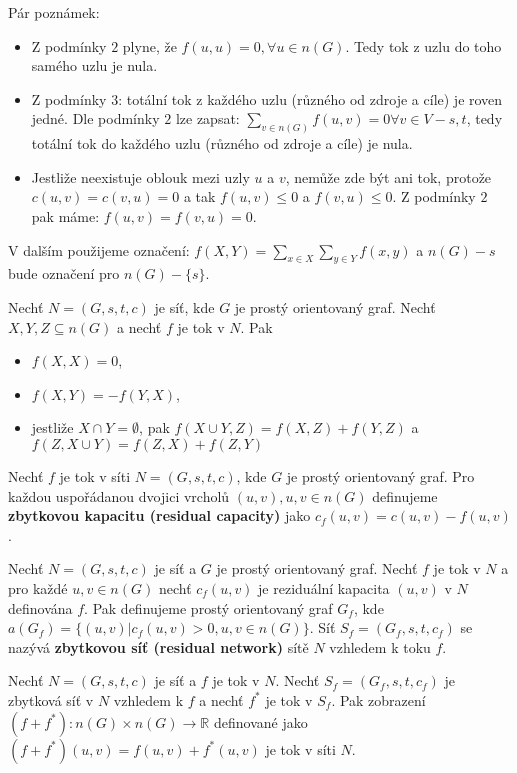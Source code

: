 Pár poznámek:
\begin{itemize}
    \item Z podmínky $2$ plyne, že $f(u,u) = 0, \forall u \in n(G)$. Tedy tok z uzlu do toho samého uzlu je nula.
    \item Z podmínky $3$: totální tok z každého uzlu (různého od zdroje a cíle) je roven jedné. Dle podmínky $2$ lze zapsat: $\sum_{v \in n(G)} f(u,v) = 0 \forall v \in V - {s,t}$, tedy totální tok do každého uzlu (různého od zdroje a cíle) je nula.
    \item Jestliže neexistuje oblouk mezi uzly $u$ a $v$, nemůže zde být ani tok, protože $c(u,v) = c(v,u) = 0$ a tak $f(u,v) \leq 0$ a $f(v,u) \leq 0$. Z podmínky $2$ pak máme: $f(u,v) = f(v,u) = 0$.
\end{itemize}

V dalším použijeme označení: $f(X,Y)=\sum\limits_{x\in X}\sum\limits_{y\in Y}f(x,y)$ a $n(G) - s$ bude označení pro $n(G) - \{ s \}$.

\begin{theorem}
Nechť $N = (G,s,t,c)$ je síť, kde $G$ je prostý orientovaný graf. Nechť $X, Y, Z \subseteq n(G)$ a nechť $f$ je tok v $N$. Pak
\begin{itemize}
    \item $f(X,X)=0$,
    \item $f(X,Y)=-f(Y,X)$,
    \item jestliže $X\cap Y=\emptyset$, pak $f(X\cup Y,Z)=f(X,Z)+f(Y,Z)$
a $f(Z,X\cup Y)=f(Z,X)+f(Z,Y)$
\end{itemize}
\end{theorem}

\begin{definition}
Nechť $f$ je tok v síti $N = (G, s, t, c)$, kde $G$ je prostý orientovaný graf. Pro každou uspořádanou dvojici vrcholů $(u,v), u,v \in n(G)$ definujeme \textbf{zbytkovou kapacitu (residual capacity)} jako $c_f (u,v) = c(u,v) - f(u,v)$.
\end{definition}
\begin{definition}
Nechť $N = (G, s, t, c)$ je síť a $G$ je prostý orientovaný graf. Nechť $f$ je tok v $N$ a pro každé $u, v \in n(G)$ nechť $c_f (u,v)$ je reziduální kapacita $(u,v)$ v $N$ definována $f$. Pak definujeme prostý orientovaný graf $G_f$, kde $a(G_f) = \{ (u,v) | c_f (u,v) > 0, u,v \in n(G)\}$. Síť $S_f = (G_f, s, t, c_f)$ se nazývá \textbf{zbytkovou síť (residual network)} sítě $N$ vzhledem k toku $f$.
\end{definition}

\begin{theorem}[2]
Nechť $N = (G,s,t,c)$ je síť a $f$ je tok v $N$. Nechť $S_f = (G_f, s, t, c_f)$ je zbytková síť v $N$ vzhledem k $f$ a nechť $f^*$ je tok v $S_f$. Pak zobrazení $(f+f^*) : n(G) \times n(G) \rightarrow \mathbb{R}$ definované jako $(f+f^*) (u,v) = f(u,v) + f^*(u,v)$ je tok v síti $N$.
\end{theorem}

